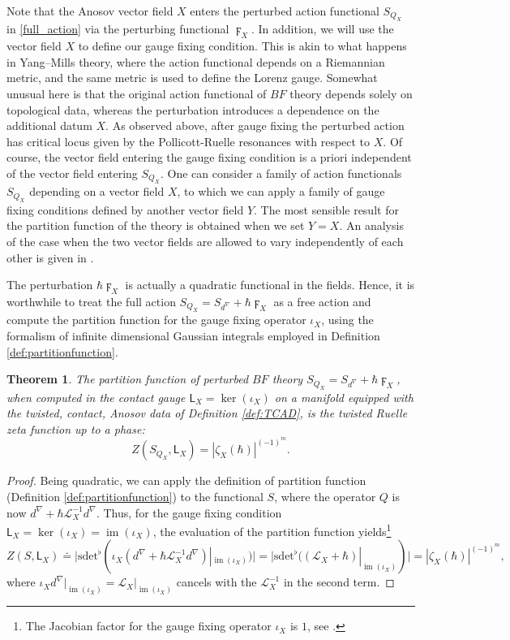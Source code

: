 \documentclass[reqno]{amsart}
\newtheorem{thm}{Theorem}[section]
\theoremstyle{definition}
\theoremstyle{remark}
\renewcommand{\d}{d^\nabla}
\newcommand{\h}{\hbar}
\newcommand{\sfL}{\mathsf{L}}
\renewcommand{\L}{\mathcal{L}}
\newcommand{\sdet}{\mathrm{sdet}^\flat}
\DeclareMathOperator{\im}{im}
\begin{document}
\begin{rmk}[Dependence on $X$]
\label{remark_vector_field}
Note that the Anosov vector field $X$ enters the perturbed action functional $S_{Q_X}$ in \eqref{full_action} via the perturbing functional $\digamma_X$. In addition, we will use the vector field $X$ to define our gauge fixing condition. This is akin to what happens in Yang--Mills theory, where the action functional depends on a Riemannian metric, and the same metric is used to define the Lorenz gauge. Somewhat unusual here is that the original action functional of $BF$ theory depends solely on topological data, whereas the perturbation introduces a dependence on the additional datum $X$. As observed above, after gauge fixing the perturbed action has critical locus given by the Pollicott-Ruelle resonances with respect to $X$.
Of course, the vector field entering the gauge fixing condition is a priori independent of the vector field entering $S_{Q_X}$. One can consider a family of action functionals $S_{Q_X}$ depending on a vector field $X$, to which we can apply a family of gauge fixing conditions defined by another vector field $Y$. The most sensible result for the partition function of the theory is obtained when we set $Y=X$. An analysis of the case when the two vector fields are allowed to vary independently of each other is given in \cite{ThomasThesis}.
\end{rmk}


The perturbation $\h \digamma_X$ is actually a quadratic functional in the fields. Hence, it is worthwhile to treat the full action $S_{Q_X} = S_{\d} + \h \digamma_X$ as a free action and compute the partition function for the gauge fixing operator $\iota_X$, using the formalism of infinite dimensional Gaussian integrals employed in Definition \ref{def:partitionfunction}. 

\begin{thm}\label{thm:Result_PF}
The partition function of perturbed $BF$ theory $S_{Q_X} = S_{\d} + \hbar \digamma_X$, when computed in the contact gauge $\sfL_X = \ker(\iota_X)$ on a manifold equipped with the twisted, contact, Anosov data of Definition \ref{def:TCAD}, is the twisted Ruelle zeta function up to a phase:
\[
Z(S_{Q_X},\sfL_X) = |\zeta_X(\hbar)|^{(-1)^m}.
\]
\end{thm}

\begin{proof}

Being quadratic, we can apply the definition of partition function (Definition \ref{def:partitionfunction}) to the functional $S$, where the operator $Q$ is now $\d+\h\L_X^{-1}\d$. Thus, for the gauge fixing condition $\sfL_X = \ker(\iota_X) = \im(\iota_X)$, the evaluation of the partition function yields\footnote{The Jacobian factor for the gauge fixing operator $\iota_X$ is $1$, see \cite{hadfield_kandel_schiavina,Schiavina_Stucker1}.}
$$Z(S,\sfL_X) \doteq \big|\sdet(\iota_X(\d+\h\L_X^{-1}\d)|_{\im(\iota_X)})\big| = \big|\sdet((\L_X+\h)|_{\im(\iota_X)})\big| = |\zeta_X(\hbar)|^{(-1)^m},$$
where $\iota_X\d\vert_{\im(\iota_X)} = \L_X\vert_{\im(\iota_X)}$ cancels with the $\L_X^{-1}$ in the second term.
\end{proof}
\end{document}

